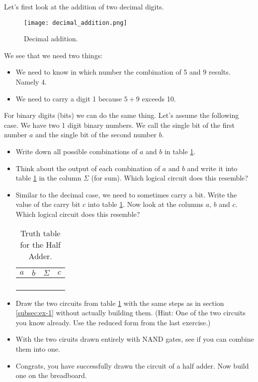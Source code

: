 Let's first look at the addition of two decimal digits. 

\begin{figure}[h]
	\centering		  
	\texttt{[image: decimal\_addition.png]}
	\caption{Decimal addition.}
	\label{fig:decimal_addition}
\end{figure}
We see that we need two things:
\begin{itemize}
	\item We need to know in which number the combination of 5 and 9 results. Namely 4.
	\item We need to carry a digit 1 because $5+9$ exceeds 10.
\end{itemize}

For binary digits (bits) we can do the same thing. Let's assume the following case. We have two 1 digit binary numbers. We call the single bit of the first number $a$ and the single bit of the second number $b$.
\begin{itemize}
	\item Write down all possible combinations of $a$ and $b$ in table \ref{tab:half-adder-truth-table}.
	\item Think about the output of each combination of $a$ and $b$ and write it into table \ref{tab:half-adder-truth-table} in the column $\Sigma$ (for sum). Which logical circuit does this resemble?
	\item Similar to the decimal case, we need to sometimes carry a bit. Write the value of the carry bit $c$ into table \ref{tab:half-adder-truth-table}. Now look at the columns $a$, $b$ and $c$. Which logical circuit does this resemble?
	
	\begin{table}[H]
		\centering
		\begin{tabular}{|c|c||c|c|}
			\hline
			$a$ & $b$ & $\Sigma$   & $c$ \\ \hline
			&     &           &       \\ \hline
			&     &           &       \\ \hline
			&     &           &       \\ \hline
			&     &           &       \\ \hline
		\end{tabular}
		\caption{Truth table for the Half Adder.}
		\label{tab:half-adder-truth-table}
	\end{table}

	\item Draw the two circuits from table \ref{tab:half-adder-truth-table} with the same steps as in section \ref{subsec:ex-1} without actually building them. (Hint: One of the two circuits you know already. Use the reduced form from the last exercise.)
	\item With the two ciruits drawn entirely with NAND gates, see if you can combine them into one.
	\item Congrats, you have successfully drawn the circuit of a half adder. Now build one on the breadboard.
\end{itemize}
